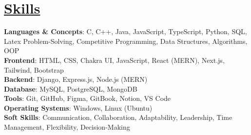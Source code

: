 \documentclass[a4paper, 11pt]{article}
\newcommand{\resumeSection}[2]{
  \section{\textbf{\href{#1}{#2}}}
}
\begin{document}
\resumeSection{https://joyant.me/skills}{Skills}
 \begin{itemize}[leftmargin=0in, label={}]
    \small{\item{
     \textbf{Languages \& Concepts}{: C, C++, Java, JavaScript, TypeScript, Python, SQL, Latex Problem-Solving, Competitive Programming, Data Structures, Algorithms, OOP} \\
     \textbf{Frontend}{: HTML, CSS, Chakra UI, JavaScript, React (MERN), Next.js, Tailwind, Bootstrap} \\
     \textbf{Backend}{: Django, Express.js, Node.js (MERN)} \\
     \textbf{Database}{: MySQL, PostgreSQL, MongoDB} \\
     \textbf{Tools}{: Git, GitHub, Figma, GitBook, Notion, VS Code} \\
     \textbf{Operating Systems}{: Windows, Linux (Ubuntu)} \\
     \textbf{Soft Skills}{: Communication, Collaboration, Adaptability, Leadership, Time Management, Flexibility, Decision-Making}
    }}
 \end{itemize}
\end{document}

